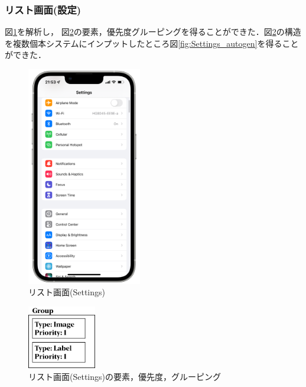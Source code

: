 \subsubsection{リスト画面(設定)}
図\ref{fig:Settings_screenshot}を解析し， 図\ref{fig:Settings_ViewStructure}の要素，優先度グルーピングを得ることができた．図\ref{fig:Settings_ViewStructure}の構造を複数個本システムにインプットしたところ図\ref{fig:Settings_autogen}を得ることができた．

\begin{figure}[htbp]
  \begin{minipage}{\hsize}
    \begin{center}
       \includegraphics[width=50mm]{img/Settings_screenshot.png}
    \end{center}
    \caption{リスト画面(Settings)}
    \label{fig:Settings_screenshot}
  \end{minipage}
\end{figure}

\begin{figure}[htbp]
  \begin{minipage}{\hsize}
    \begin{center}
       \includegraphics[width=30mm]{img/Settings_ViewStructure.png}
    \end{center}
    \caption{リスト画面(Settings)の要素，優先度，グルーピング}
    \label{fig:Settings_ViewStructure}
  \end{minipage}
\end{figure}

